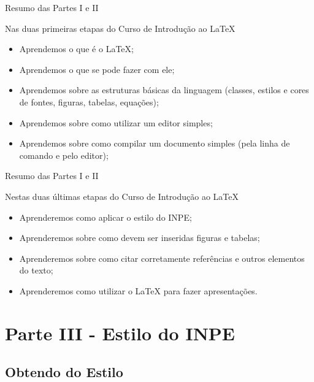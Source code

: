 \documentclass[10pt]{beamer}
\begin{document}
\begin{frame}{Resumo das Partes I e II}
\begin{block}{Nas duas primeiras etapas do Curso de Introdução ao \LaTeX{}}
\begin{itemize}[label=\textbullet]
    \pause
    \item Aprendemos o que é o \LaTeX{};
    \pause
    \item Aprendemos o que se pode fazer com ele;
    \pause
    \item Aprendemos sobre as estruturas básicas da linguagem (classes, estilos e cores de fontes, figuras, tabelas, equações);
    \pause
    \item Aprendemos sobre como utilizar um editor simples;
    \pause
    \item Aprendemos sobre como compilar um documento simples (pela linha de comando e pelo editor);
\end{itemize}
\end{block}
\end{frame}

\begin{frame}{Resumo das Partes I e II}
\begin{block}{Nestas duas últimas etapas do Curso de Introdução ao \LaTeX{}}
\begin{itemize}[label=\textbullet]
    \pause
    \item Aprenderemos como aplicar o estilo do INPE;
    \pause
    \item Aprenderemos sobre como devem ser inseridas figuras e tabelas;
    \pause
    \item Aprenderemos sobre como citar corretamente referências e outros elementos do texto;
    \pause
    \item Aprenderemos como utilizar o \LaTeX{} para fazer apresentações.
\end{itemize}
\end{block}
\end{frame}

\section{Parte III - Estilo do INPE}

\subsection{Obtendo do Estilo}
\end{document}
